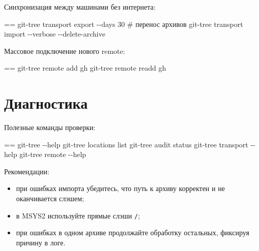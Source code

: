 \documentclass{book}
\makeatletter
\newenvironment{Texinfopreformatted}{%
  \par\GNUTobeylines\obeyspaces\frenchspacing\parskip=\z@\parindent=\z@}{}
{\catcode`\^^M=13 \gdef\GNUTobeylines{\catcode`\^^M=13 \def^^M{\null\par}}}
\newenvironment{Texinfoindented}{\begin{list}{}{}\item\relax}{\end{list}}
\renewcommand{\_}{\Texinfounderscore\discretionary{}{}{}}
\makeatother
\begin{document}
Синхронизация между машинами без интернета:
\begin{Texinfoindented}
\begin{Texinfopreformatted}%
\ttfamily git-tree transport export {-}{-}days 30
\# перенос архивов
git-tree transport import {-}{-}verbose {-}{-}delete-archive
\end{Texinfopreformatted}
\end{Texinfoindented}

Массовое подключение нового remote:
\begin{Texinfoindented}
\begin{Texinfopreformatted}%
\ttfamily git-tree remote add gh
git-tree remote readd gh
\end{Texinfopreformatted}
\end{Texinfoindented}

\chapter{{Диагностика}}
\label{anchor:_0414_0438_0430_0433_043d_043e_0441_0442_0438_043a_0430}%

Полезные команды проверки:
\begin{Texinfoindented}
\begin{Texinfopreformatted}%
\ttfamily git-tree {-}{-}help
git-tree locations list
git-tree audit status
git-tree transport {-}{-}help
git-tree remote {-}{-}help
\end{Texinfopreformatted}
\end{Texinfoindented}

Рекомендации:
\begin{itemize}[label=\textbullet{}]
\item при ошибках импорта убедитесь, что путь к архиву корректен и не оканчивается слэшем;
\item в MSYS2 используйте прямые слэши \texttt{/};
\item при ошибках в одном архиве продолжайте обработку остальных, фиксируя причину в логе.
\end{itemize}
\end{document}
